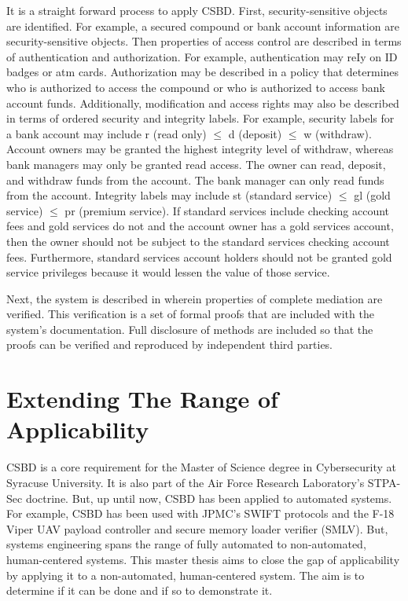 \documentclass[../../main/main.tex]{subfiles}
\begin{document}
It is a straight forward process to apply CSBD.  First, security-sensitive objects are identified.  For example, a secured compound or bank account information are security-sensitive objects.  Then properties of access control are described in terms of authentication and authorization.  For example, authentication may reIy on ID badges or atm cards.   Authorization may be described in a policy that determines who is authorized to access the compound or who is authorized to access bank account funds.  Additionally, modification and access rights may also be described in terms of ordered security and integrity labels.  For example, security labels for a bank account may include r (read only) $\leq$ d (deposit) $\leq$  w (withdraw).  Account owners may be granted the highest integrity level of withdraw, whereas bank managers may only be granted read  access.   The owner can read, deposit, and withdraw funds from the account.  The bank manager can only read funds from the account.  Integrity labels may include st (standard service) $\leq$ gl (gold service) $\leq$ pr (premium service).  If standard services include checking account fees and gold services do not and the account owner has a gold services account, then the owner should not be subject to the standard services checking account fees.  Furthermore, standard services account holders should not be granted gold service privileges because it would lessen the value of those service.

 Next, the system is described in  wherein properties of complete mediation are verified.  This verification is a set of formal proofs that are included with the system's documentation.  Full disclosure of methods are included so that the proofs can be verified and reproduced by independent third parties.




\section{Extending The Range of Applicability}\label{sec:intro:motivation}
CSBD is a core requirement for the Master of Science degree in Cybersecurity at Syracuse University.  It is also part of the Air Force Research Laboratory's STPA-Sec doctrine.   But, up until now, CSBD has been applied to automated systems.  For example, CSBD has been used with JPMC's SWIFT protocols \cite{pkm} and the F-18 Viper UAV payload controller and secure memory loader verifier (SMLV).  But, systems engineering spans the range of fully automated to non-automated, human-centered systems.  This master thesis aims to close the gap of  applicability by applying it to a non-automated, human-centered system.  The aim is to determine if it can be done and if so to demonstrate it.
\end{document}
